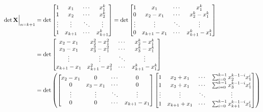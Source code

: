 \documentclass[10pt]{article}
\begin{document}
\begin{enumerate}[leftmargin=*, label={(\alph*)}]
    \begin{align*}
        \det\mathbf{X}\Big|_{n=k+1} &= \det\begin{bmatrix}
            1 & x_1 & \cdots & x_1^{k} \\
            1 & x_2 & \cdots & x_2^{k} \\
            \vdots & \vdots & \ddots & \vdots \\
            1 & x_{k+1} & \cdots & x_{k+1}^{k}
        \end{bmatrix} = \det\begin{bmatrix}
            1 & x_1 & \cdots & x_1^{k} \\
            0 & x_2 - x_1 & \cdots & x_2^{k} - x_1^{k} \\
            \vdots & \vdots & \ddots & \vdots \\
            0 & x_{k+1} - x_1 & \cdots & x_{k+1}^{k} - x_1^{k}
        \end{bmatrix} \\
        &= \det\begin{bmatrix}
            x_2 - x_1 & x_2^2 - x_1^2 & \cdots & x_2^{k} - x_1^{k} \\
            x_3 - x_1 & x_3^2 - x_1^2 & \cdots & x_3^{k} - x_1^{k} \\
            \vdots & \vdots & \ddots & \vdots \\
            x_{k+1} - x_1 & x_{k+1}^2 - x_1^2 & \cdots & x_{k+1}^{k} - x_1^{k}
        \end{bmatrix} \\
        &= \det\qty(\begin{bmatrix}
            x_2 - x_1 & 0 & \cdots & 0 \\
            0 & x_3 - x_1 & \cdots & 0 \\
            \vdots & \vdots & \ddots & \vdots \\
            0 & 0 & \cdots & x_{k+1} - x_1
        \end{bmatrix}\begin{bmatrix}
            1 & x_2 + x_1 & \cdots & \sum_{i=0}^{k-1}x_2^{k-1-i}x_1^{i} \\
            1 & x_3 + x_1 & \cdots & \sum_{i=0}^{k-1}x_3^{k-1-i}x_1^{i} \\
            \vdots & \vdots & \ddots & \vdots \\
            1 & x_{k+1} + x_1 & \cdots & \sum_{i=0}^{k-1}x_{k+1}^{k-1-i}x_1^{i} \\
        \end{bmatrix}) \\ 

\end{align*}
\end{enumerate}
\end{document}
